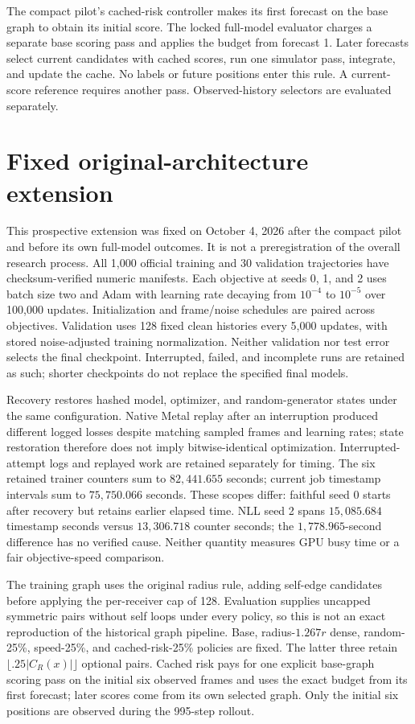 The compact pilot's cached-risk controller makes its first forecast on the base graph to obtain its initial score. The locked full-model evaluator charges a separate base scoring pass and applies the budget from forecast 1. Later forecasts select current candidates with cached scores, run one simulator pass, integrate, and update the cache. No labels or future positions enter this rule. A current-score reference requires another pass. Observed-history selectors are evaluated separately.

\section{Fixed original-architecture extension}
\label{sec:full-protocol}
This prospective extension was fixed on October 4, 2026 after the compact pilot
and before its own full-model outcomes. It is not a preregistration of the
overall research process. All 1,000 official training and 30 validation
trajectories have checksum-verified numeric manifests. Each objective at seeds
0, 1, and 2 uses batch size two and Adam with learning rate decaying from
$10^{-4}$ to $10^{-5}$ over 100,000 updates. Initialization and frame/noise
schedules are paired across objectives. Validation uses 128 fixed clean
histories every 5,000 updates, with stored noise-adjusted training normalization.
Neither validation nor test error selects the final checkpoint. Interrupted,
failed, and incomplete runs are retained as such; shorter checkpoints do not
replace the specified final models.

Recovery restores hashed model, optimizer, and random-generator states under
the same configuration. Native Metal replay after an interruption produced
different logged losses despite matching sampled frames and learning rates;
state restoration therefore does not imply bitwise-identical optimization.
Interrupted-attempt logs and replayed work are retained separately for timing.
The six retained trainer counters sum to $82{,}441.655$ seconds; current
job timestamp intervals sum to $75{,}750.066$ seconds. These scopes differ:
faithful seed 0 starts after recovery but retains earlier elapsed time.
NLL seed 2 spans $15{,}085.684$ timestamp seconds versus $13{,}306.718$
counter seconds; the $1{,}778.965$-second difference has no verified cause.
Neither quantity measures GPU busy time or a fair objective-speed comparison.

The training graph uses the original radius rule, adding self-edge candidates before applying the per-receiver cap of 128.
Evaluation supplies uncapped symmetric pairs without self loops under every
policy, so this is not an exact reproduction of the historical graph pipeline.
Base, radius-$1.267r$ dense, random-25\%, speed-25\%, and cached-risk-25\%
policies are fixed. The latter three retain
$\lfloor.25|C_R(x)|\rfloor$ optional pairs. Cached risk pays for one explicit
base-graph scoring pass on the initial six observed frames and uses the exact
budget from its first forecast; later scores come from its own selected graph.
Only the initial six positions are observed during the 995-step rollout.

